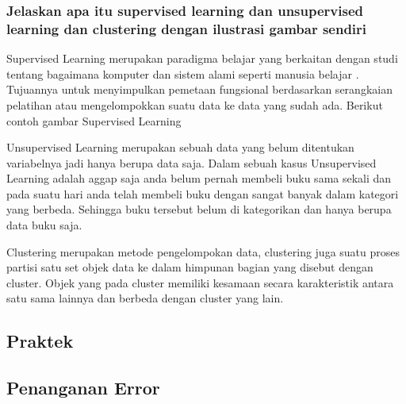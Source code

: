 	\subsubsection{Jelaskan apa itu supervised learning dan unsupervised learning dan clustering dengan ilustrasi gambar sendiri}
	\par Supervised Learning merupakan paradigma belajar yang berkaitan dengan studi tentang bagaimana
	komputer dan sistem alami seperti manusia belajar \cite{zhou2018brief}. Tujuannya untuk menyimpulkan pemetaan fungsional berdasarkan serangkaian pelatihan atau mengelompokkan suatu data ke data yang sudah ada. Berikut contoh gambar Supervised Learning
	\par Unsupervised Learning merupakan sebuah data yang belum ditentukan variabelnya jadi hanya berupa data saja. Dalam sebuah kasus Unsupervised Learning adalah aggap saja anda belum pernah membeli buku sama sekali dan pada suatu hari anda telah membeli buku dengan sangat banyak dalam kategori yang berbeda. Sehingga buku tersebut belum di kategorikan dan hanya berupa data buku saja.
	\par Clustering merupakan metode pengelompokan data, clustering juga suatu proses partisi satu set objek data ke dalam himpunan bagian yang disebut dengan cluster. Objek yang pada cluster memiliki kesamaan secara karakteristik antara satu sama lainnya dan berbeda dengan cluster yang lain.

\subsection{Praktek}

\subsection{Penanganan Error}

